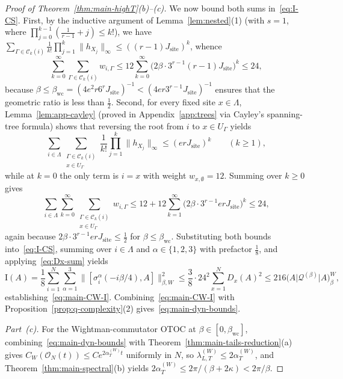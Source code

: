 \documentclass[11pt,a4paper]{article}
\numberwithin{equation}{section}
\theoremstyle{plain}
\theoremstyle{definition}
\begin{document}
\begin{proof}[Proof of Theorem~\ref{thm:main-highT}(b)--(c)]
We now bound both sums in~\eqref{eq:I-CS}. First, by the inductive argument of Lemma~\ref{lem:nested}(1) (with $s=1$, where $\prod_{j=0}^{k-1}(\frac{1}{r-1}+j)\le k!$), we have $\sum_{\Gamma\in\mathcal{C}_k(i)} \frac{1}{k!}\prod_{j=1}^k \|h_{X_j}\|_\infty \le ((r-1)J_{\mathrm{site}})^k$, whence
\[
  \sum_{k=0}^\infty\sum_{\Gamma\in\mathcal{C}_k(i)} w_{i,\Gamma}
  \le 12\sum_{k=0}^\infty \bigl(2\beta\cdot 3^{r-1}(r-1)J_{\mathrm{site}}\bigr)^k \le 24,
\]
because $\beta\le\beta_{\mathrm{wc}} = (4e^2 r 6^r J_{\mathrm{site}})^{-1} < (4er 3^{r-1} J_{\mathrm{site}})^{-1}$ ensures that the geometric ratio is less than $\frac{1}{2}$. Second, for every fixed site $x\in\Lambda$, Lemma~\ref{lem:app-cayley} (proved in Appendix~\ref{app:trees} via Cayley's spanning-tree formula) shows that reversing the root from $i$ to $x\in U_\Gamma$ yields
\[
  \sum_{i\in\Lambda}\sum_{\substack{\Gamma\in\mathcal{C}_k(i) \\ x\in U_\Gamma}} \frac{1}{k!}\prod_{j=1}^k \|h_{X_j}\|_\infty
  \le (er J_{\mathrm{site}})^k \qquad (k\ge 1),
\]
while at $k=0$ the only term is $i=x$ with weight $w_{x,\emptyset}=12$. Summing over $k\ge 0$ gives
\[
  \sum_{i\in\Lambda}\sum_{k=0}^\infty\sum_{\substack{\Gamma\in\mathcal{C}_k(i) \\ x\in U_\Gamma}} w_{i,\Gamma}
  \le 12 + 12\sum_{k=1}^\infty \bigl(2\beta\cdot 3^{r-1} e r J_{\mathrm{site}}\bigr)^k \le 24,
\]
again because $2\beta\cdot 3^{r-1} e r J_{\mathrm{site}} \le \frac{1}{2}$ for $\beta\le\beta_{\mathrm{wc}}$. Substituting both bounds into~\eqref{eq:I-CS}, summing over $i\in\Lambda$ and $\alpha\in\{1,2,3\}$ with prefactor $\frac{1}{8}$, and applying~\eqref{eq:Dx-sum} yields
\[
  \mathrm{I}(A) = \frac{1}{8}\sum_{i=1}^N\sum_{\alpha=1}^3 \bigl\|[\sigma_i^\alpha(-i\beta/4), A]\bigr\|_{\beta,W}^2
  \le \frac{3}{8}\cdot 24^2 \sum_{x=1}^N D_x(A)^2
  \le 216\bigl(A\big|\mathcal{Q}^{(\beta)}\big|A\bigr)_\beta^W,
\]
establishing~\eqref{eq:main-CW-I}. Combining~\eqref{eq:main-CW-I} with Proposition~\ref{prop:q-complexity}(2) gives~\eqref{eq:main-dyn-bounds}.

\emph{Part~(c).} For the Wightman-commutator OTOC at $\beta\in[0,\beta_{\mathrm{wc}}]$, combining~\eqref{eq:main-dyn-bounds} with Theorem~\ref{thm:main-tails-reduction}(a) gives $C_W(\mathcal{O}_N(t)) \le C e^{2\alpha_T^{(W)} t}$ uniformly in $N$, so $\lambda_{L,T}^{(W)} \le 2\alpha_T^{(W)}$, and Theorem~\ref{thm:main-spectral}(b) yields $2\alpha_T^{(W)} \le 2\pi/(\beta+2\kappa) < 2\pi/\beta$.


\end{proof}
\end{document}

